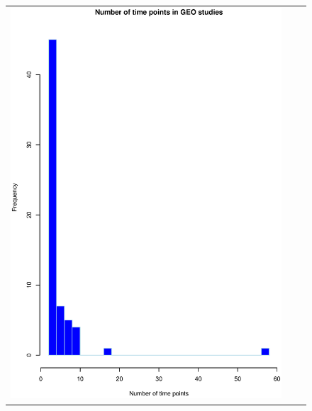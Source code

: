 \begin{figure}[h!]
\centering
\begin{tabular}{ccc}
\includegraphics[scale=0.24]{GEOtime.eps} &

\end{tabular}
\end{figure}

